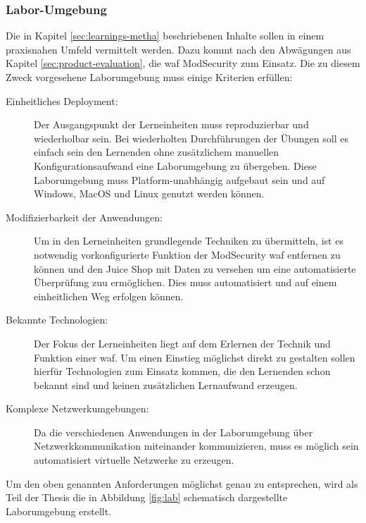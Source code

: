 \subsubsection{Labor-Umgebung}

Die in Kapitel \ref{sec:learnings-metha} beschriebenen Inhalte sollen in einem praxisnahen Umfeld vermittelt werden.
Dazu kommt nach den Abwägungen aus Kapitel \ref{sec:product-evaluation}, die \ac{waf} ModSecurity zum Einsatz.
Die zu diesem Zweck vorgesehene Laborumgebung muss einige Kriterien erfüllen:
\begin{description}
    \item[Einheitliches Deployment:] Der Ausgangspunkt der Lerneinheiten muss reproduzierbar und wiederholbar sein. 
    Bei wiederholten Durchführungen der Übungen soll es einfach sein den Lernenden ohne zusätzlichem manuellen Konfigurationsaufwand eine Laborumgebung zu übergeben. 
    Diese Laborumgebung muss Platform-unabhängig aufgebaut sein und auf Windows, MacOS und Linux genutzt werden können.
    \item[Modifizierbarkeit der Anwendungen:] Um in den Lerneinheiten grundlegende Techniken zu übermitteln, ist es notwendig vorkonfigurierte Funktion der ModSecurity \ac{waf} entfernen zu können und den Juice Shop mit Daten zu versehen um eine automatisierte Überprüfung zuu ermöglichen.
    Dies muss automatisiert und auf einem einheitlichen Weg erfolgen können.
    \item[Bekannte Technologien:] Der Fokus der Lerneinheiten liegt auf dem Erlernen der Technik und Funktion einer \ac{waf}. 
    Um einen Einstieg möglichst direkt zu gestalten sollen hierfür Technologien zum Einsatz kommen, die den Lernenden schon bekannt sind und keinen zusätzlichen Lernaufwand erzeugen.
    \item[Komplexe Netzwerkumgebungen:] Da die verschiedenen Anwendungen in der Laborumgebung über Netzwerkkommunikation miteinander kommunizieren, muss es möglich sein automatisiert virtuelle Netzwerke zu erzeugen.
\end{description}

Um den oben genannten Anforderungen möglichst genau zu entsprechen, wird als Teil der Thesis die in Abbildung \ref{fig:lab} schematisch dargestellte Laborumgebung erstellt.

